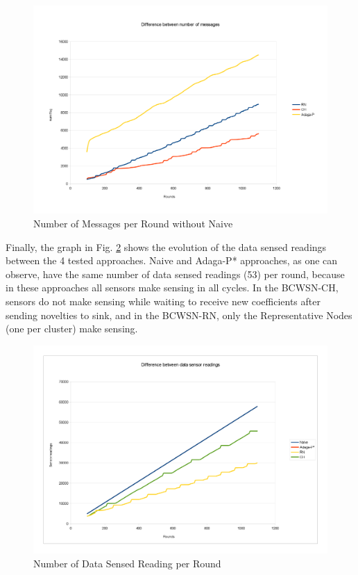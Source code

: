 \documentclass[conference]{IEEEtran}
\begin{document}
\begin{figure}[!htb]
\centering
	\includegraphics[scale=0.09]{graf_NumMsg_without_naive_.png}
    \caption{Number of Messages per Round without Naive}
    \label{fig:num-msg-without-naive}
\end{figure}

Finally, the graph in Fig. \ref{fig:sens-reading} shows the evolution of
the data sensed readings between the 4 tested approaches.
Naive and Adaga-P* approaches, as one can observe, have the same number of data
sensed readings (53) per round, because in these approaches all sensors
make sensing in all cycles. In the BCWSN-CH, sensors do not make sensing while
waiting to receive new coefficients after sending novelties to sink, and in the
BCWSN-RN, only the Representative Nodes (one per cluster) make sensing.

\begin{figure}[!htb]
\centering
	\includegraphics[scale=0.09]{graf_SREAD_.png}
    \caption{Number of Data Sensed Reading per Round}
    \label{fig:sens-reading}
\end{figure}
\end{document}
